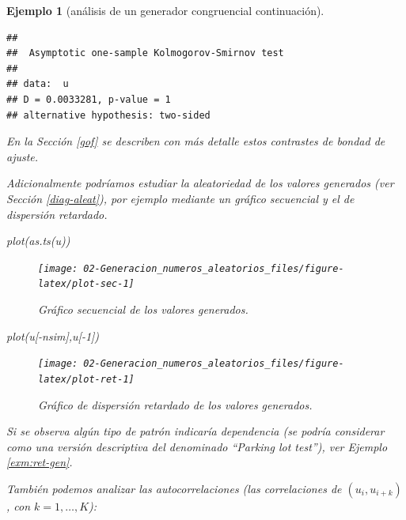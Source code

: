 \documentclass[
]{book}
\newenvironment{Shaded}{\begin{snugshade}}{\end{snugshade}}
\newcommand{\DecValTok}[1]{\textcolor[rgb]{0.00,0.00,0.81}{#1}}
\newcommand{\FunctionTok}[1]{\textcolor[rgb]{0.00,0.00,0.00}{#1}}
\newcommand{\NormalTok}[1]{#1}
\newcommand{\SpecialCharTok}[1]{\textcolor[rgb]{0.00,0.00,0.00}{#1}}
\theoremstyle{break}
\newtheorem{example}{Ejemplo}[chapter]
\theoremstyle{nonumberplain}
\begin{document}
\begin{example}[análisis de un generador congruencial continuación]
\begin{verbatim}
## 
##  Asymptotic one-sample Kolmogorov-Smirnov test
## 
## data:  u
## D = 0.0033281, p-value = 1
## alternative hypothesis: two-sided
\end{verbatim}

En la Sección \ref{gof} se describen con más detalle estos contrastes de bondad de ajuste.

Adicionalmente podríamos estudiar la aleatoriedad de los valores generados (ver Sección \ref{diag-aleat}), por ejemplo mediante un gráfico secuencial y el de dispersión retardado.

\begin{Shaded}
\begin{Highlighting}[]
\FunctionTok{plot}\NormalTok{(}\FunctionTok{as.ts}\NormalTok{(u))}
\end{Highlighting}
\end{Shaded}

\begin{figure}[!htb]

{\centering \texttt{[image: 02-Generacion\_numeros\_aleatorios\_files/figure-latex/plot-sec-1]} 

}

\caption{Gráfico secuencial de los valores generados.}\label{fig:plot-sec}
\end{figure}

\begin{Shaded}
\begin{Highlighting}[]
\FunctionTok{plot}\NormalTok{(u[}\SpecialCharTok{{-}}\NormalTok{nsim],u[}\SpecialCharTok{{-}}\DecValTok{1}\NormalTok{])}
\end{Highlighting}
\end{Shaded}

\begin{figure}[!htb]

{\centering \texttt{[image: 02-Generacion\_numeros\_aleatorios\_files/figure-latex/plot-ret-1]} 

}

\caption{Gráfico de dispersión retardado de los valores generados.}\label{fig:plot-ret}
\end{figure}

Si se observa algún tipo de patrón indicaría dependencia (se podría considerar como una versión descriptiva del denominado ``Parking lot test''), ver Ejemplo \ref{exm:ret-gen}.

También podemos analizar las autocorrelaciones (las correlaciones de \((u_{i},u_{i+k})\), con \(k=1,\ldots,K\)):


\end{example}
\end{document}
